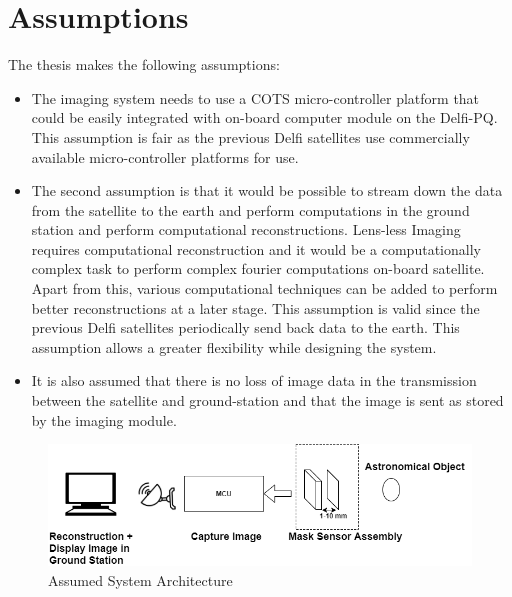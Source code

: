 \section{Assumptions}
The thesis makes the following assumptions:
\begin{itemize}
\item The imaging system needs to use a COTS micro-controller platform that could be easily integrated with on-board computer module on the Delfi-PQ. This assumption is fair as the previous Delfi satellites use commercially available micro-controller platforms for use.
\item The second assumption is that it would be possible to stream down the data from the satellite to the earth and perform computations in the ground station and perform computational reconstructions. Lens-less Imaging requires computational reconstruction and it would be a computationally complex task to perform complex fourier computations on-board satellite. Apart from this, various computational techniques can be added to perform better reconstructions at a later stage. This assumption is valid since the previous Delfi satellites periodically send back data to the earth. This assumption allows a greater flexibility while designing the system.
\item It is also assumed that there is no loss of image data in the transmission between the satellite and ground-station and that the image is sent as stored by the imaging module.
\end{itemize}
\begin{figure}[htb]
\includegraphics[width=\textwidth]{pics/Sys-Arch-1}
\caption{Assumed System Architecture}
\label{fig:System Architecture}
\end{figure}

\vspace{1\baselineskip}

\noindent


